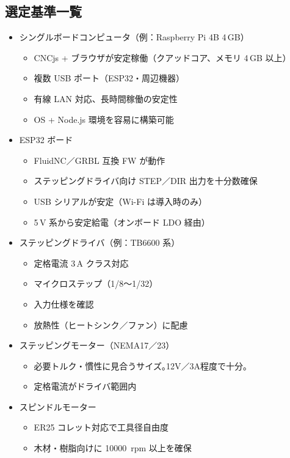 \documentclass[uplatex,dvipdfmx]{ujarticle}
\begin{document}
\subsection*{選定基準一覧}

\begin{itemize}
  \item シングルボードコンピュータ（例：Raspberry Pi 4B 4\,GB）
    \begin{itemize}
      \item CNCjs + ブラウザが安定稼働（クアッドコア、メモリ 4\,GB 以上）
      \item 複数 USB ポート（ESP32・周辺機器）
      \item 有線 LAN 対応、長時間稼働の安定性
      \item OS + Node.js 環境を容易に構築可能
    \end{itemize}
  \item ESP32 ボード
    \begin{itemize}
      \item FluidNC／GRBL 互換 FW が動作
      \item ステッピングドライバ向け STEP／DIR 出力を十分数確保
      \item USB シリアルが安定（Wi-Fi は導入時のみ）
      \item 5\,V 系から安定給電（オンボード LDO 経由）
    \end{itemize}
  \item ステッピングドライバ（例：TB6600 系）
    \begin{itemize}
      \item 定格電流 3\,A クラス対応
      \item マイクロステップ（1/8～1/32）
      \item 入力仕様を確認
      \item 放熱性（ヒートシンク／ファン）に配慮
    \end{itemize}
  \item ステッピングモーター（NEMA17／23）
    \begin{itemize}
      \item 必要トルク・慣性に見合うサイズ｡12V／3A程度で十分｡
      \item 定格電流がドライバ範囲内
    \end{itemize}
  \item スピンドルモーター
    \begin{itemize}
      \item ER25 コレット対応で工具径自由度
      \item 木材・樹脂向けに \SI{10000}{rpm} 以上を確保

\end{itemize}
\end{itemize}
\end{document}
